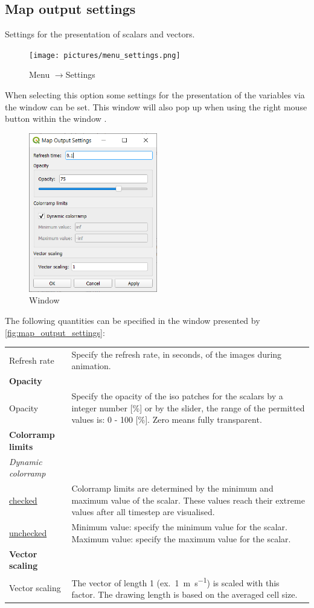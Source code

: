\documentclass{deltares_memo}
\newcommand{\menuarrow}{$\rightarrow$}
\begin{document}
\subsection{Map output settings\label{sec:map_output_settings}}
Settings for the presentation of scalars and vectors.
\begin{figure}[H]
    \centering
    \texttt{[image: pictures/menu\_settings.png]}
    \caption{Menu \menuarrow Settings}
\end{figure}
When selecting this option some settings for the presentation of the variables via the window  can be set.
This window will also pop up when using the right mouse button within the window .
\begin{figure}[H]
	\centering
	\includegraphics[width=0.50\textwidth]{pictures/map_output_settings.png}
	\caption{Window \label{fig:map_output_settings}}
\end{figure}
The following quantities can be specified in the window presented by \autoref{fig:map_output_settings}:
\begin{longtable}{p{35mm-12pt} p{\textwidth-35mm-12pt}}
	Refresh rate & Specify the refresh rate, in seconds, of the images during animation. \\
	\textbf{Opacity} & \\
	Opacity & Specify the opacity of the iso patches for the scalars by a integer number [\%] or by the slider, the range of the permitted values is: 0 - 100 [\%]. Zero means fully transparent.\\
	\textbf{Colorramp limits} & \\
	\textsl{Dynamic colorramp} & \\
	\underline{checked} & Colorramp limits are determined by the minimum and maximum value of the scalar.
	These values reach their extreme values after all timestep are visualised.\\
	\underline{unchecked} &
	Minimum value: \quad specify the minimum value for the scalar.\newline
	Maximum value: \quad specify the maximum value for the scalar.\\
	\textbf{Vector scaling} & \\
	Vector scaling & The vector of length 1 (ex.\ \SI{1}{\metre\per\second}) is scaled with this factor. The drawing length is based on the averaged cell size.
\end{longtable}
\end{document}
